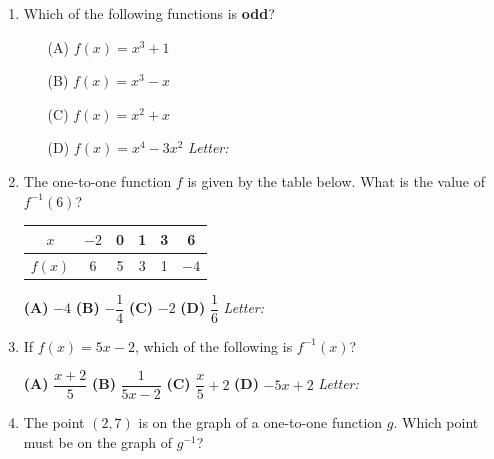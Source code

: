 \documentclass[10pt]{article}
\begin{document}
\begin{enumerate}[leftmargin=1.9em, itemsep=14pt]

\item Which of the following functions is \textbf{odd}?
      \begin{enumerate}[leftmargin=2.6em, itemsep=2pt]
        \item[(A)] $f(x) = x^3 + 1$
        \item[(B)] $f(x) = x^3 - x$
        \item[(C)] $f(x) = x^2 + x$
        \item[(D)] $f(x) = x^4 - 3x^2$ \hfill\textit{Letter:}~\gradedblank[id=ap1, type=choice, points=1, answer=B]{0.42in}{13pt}
      \end{enumerate}

\item The one-to-one function $f$ is given by the table below. What is the value of $f^{-1}(6)$?

      \smallskip
      \begin{center}
      \renewcommand{\arraystretch}{1.3}
      \begin{tabular}{|c|c|c|c|c|c|}
      \hline $x$ & $-2$ & 0 & 1 & 3 & 6 \\ \hline $f(x)$ & 6 & 5 & 3 & 1 & $-4$ \\ \hline
      \end{tabular}
      \end{center}

      \smallskip
      \textbf{(A)} $-4$ \hspace{2.6em} \textbf{(B)} $-\dfrac{1}{4}$ \hspace{2.6em} \textbf{(C)} $-2$ \hspace{2.6em} \textbf{(D)} $\dfrac{1}{6}$ \hfill\textit{Letter:}~\gradedblank[id=ap2, type=choice, points=1, answer=C]{0.42in}{13pt}

\item If $f(x) = 5x - 2$, which of the following is $f^{-1}(x)$?

      \smallskip
      \textbf{(A)} $\dfrac{x + 2}{5}$ \hspace{2.6em} \textbf{(B)} $\dfrac{1}{5x - 2}$ \hspace{2.6em} \textbf{(C)} $\dfrac{x}{5} + 2$ \hspace{2.6em} \textbf{(D)} $-5x + 2$ \hfill\textit{Letter:}~\gradedblank[id=ap3, type=choice, points=1, answer=A]{0.42in}{13pt}

\item The point $(2, 7)$ is on the graph of a one-to-one function $g$. Which point must be on
      the graph of $g^{-1}$?


\end{enumerate}
\end{document}
